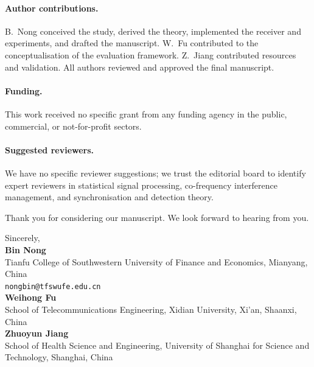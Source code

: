 \documentclass[11pt,a4paper]{article}
\begin{document}
\paragraph{Author contributions.}
B.~Nong conceived the study, derived the theory, implemented the receiver
and experiments, and drafted the manuscript. W.~Fu contributed to the
conceptualisation of the evaluation framework. Z.~Jiang contributed
resources and validation. All authors reviewed and approved the final
manuscript.

\paragraph{Funding.}
This work received no specific grant from any funding agency in the
public, commercial, or not-for-profit sectors.

\paragraph{Suggested reviewers.}
We have no specific reviewer suggestions; we trust the editorial board to
identify expert reviewers in statistical signal processing, co-frequency
interference management, and synchronisation and detection theory.

\vspace{1em}

\noindent Thank you for considering our manuscript. We look forward to
hearing from you.

\vspace{2em}

\noindent Sincerely,\\[1.4em]
\textbf{Bin Nong}\\
Tianfu College of Southwestern University of Finance and Economics, Mianyang, China\\
\texttt{nongbin@tfswufe.edu.cn}\\[0.6em]
\textbf{Weihong Fu}\\
School of Telecommunications Engineering, Xidian University, Xi'an, Shaanxi, China\\[0.6em]
\textbf{Zhuoyun Jiang}\\
School of Health Science and Engineering, University of Shanghai for
Science and Technology, Shanghai, China
\end{document}
